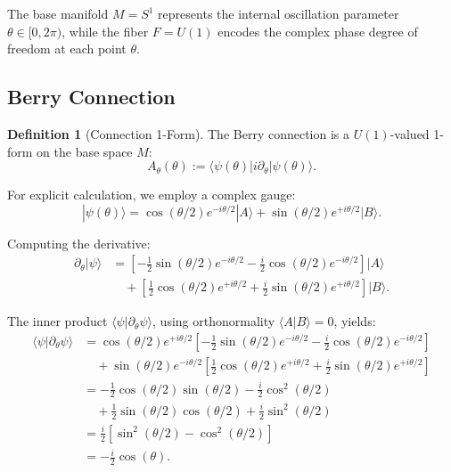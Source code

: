 \documentclass[%
 reprint,
 amsmath,amssymb,
 aps,
 prb,
]{revtex4-2}
\numberwithin{equation}{section}
\theoremstyle{definition}
\newtheorem{definition}{Definition}[section]
\theoremstyle{remark}
\newcommand{\Sone}{S^1}
\newcommand{\Uone}{U(1)}
\begin{document}
The base manifold $M = \Sone$ represents the internal oscillation parameter $\theta \in [0, 2\pi)$, while the fiber $F = \Uone$ encodes the complex phase degree of freedom at each point $\theta$.


\subsection{Berry Connection}

\begin{definition}[Connection 1-Form]
The Berry connection is a $\Uone$-valued 1-form on the base space $M$:
\begin{equation}
A_\theta(\theta) := \langle \psi(\theta) | i \partial_\theta | \psi(\theta) \rangle.
\label{eq:berry_connection}
\end{equation}
\end{definition}

For explicit calculation, we employ a complex gauge:
\begin{equation}
|\psi(\theta)\rangle = \cos(\theta/2) e^{-i\theta/2} |A\rangle + \sin(\theta/2) e^{+i\theta/2} |B\rangle.
\label{eq:state_complex}
\end{equation}

Computing the derivative:
\begin{align}
\partial_\theta |\psi\rangle &= \left[-\frac{1}{2}\sin(\theta/2) e^{-i\theta/2} - \frac{i}{2}\cos(\theta/2) e^{-i\theta/2}\right]|A\rangle \nonumber \\
&\quad + \left[\frac{1}{2}\cos(\theta/2) e^{+i\theta/2} + \frac{i}{2}\sin(\theta/2) e^{+i\theta/2}\right]|B\rangle.
\label{eq:state_derivative}
\end{align}

\begin{widetext}
The inner product $\langle \psi | \partial_\theta \psi \rangle$, using orthonormality $\langle A|B \rangle = 0$, yields:
\begin{align}
\langle \psi | \partial_\theta \psi \rangle &= \cos(\theta/2) e^{+i\theta/2} \left[-\frac{1}{2}\sin(\theta/2) e^{-i\theta/2} - \frac{i}{2}\cos(\theta/2) e^{-i\theta/2}\right] \nonumber \\
&\quad + \sin(\theta/2) e^{-i\theta/2} \left[\frac{1}{2}\cos(\theta/2) e^{+i\theta/2} + \frac{i}{2}\sin(\theta/2) e^{+i\theta/2}\right] \nonumber \\
&= -\frac{1}{2}\cos(\theta/2)\sin(\theta/2) - \frac{i}{2}\cos^2(\theta/2) \nonumber \\
&\quad + \frac{1}{2}\sin(\theta/2)\cos(\theta/2) + \frac{i}{2}\sin^2(\theta/2) \nonumber \\
&= \frac{i}{2}[\sin^2(\theta/2) - \cos^2(\theta/2)] \nonumber \\
&= -\frac{i}{2}\cos(\theta).
\label{eq:inner_product}
\end{align}
\end{widetext}
\end{document}
